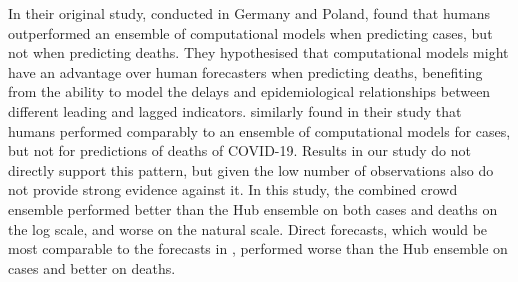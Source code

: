 \documentclass[10pt,a4paper,twocolumn]{article}
\begin{document}
In their original study, conducted in Germany and Poland, \citet{bosseComparingHumanModelbased2022} found that humans outperformed an ensemble of computational models when predicting cases, but not when predicting deaths. They hypothesised that computational models might have an advantage over human forecasters when predicting deaths, benefiting from the ability to model the delays and epidemiological relationships between different leading and lagged indicators. \citet{mcandrewChimericForecastingCombining2022} similarly found in their study that humans performed comparably to an ensemble of computational models for cases, but not for predictions of deaths of COVID-19. 
Results in our study do not directly support this pattern, but given the low number of observations also do not provide strong evidence against it. In this study, the combined crowd ensemble performed better than the Hub ensemble on both cases and deaths on the log scale, and worse on the natural scale. Direct forecasts, which would be most comparable to the forecasts in \citep{bosseComparingHumanModelbased2022}, performed worse than the Hub ensemble on cases and better on deaths. 
\end{document}
